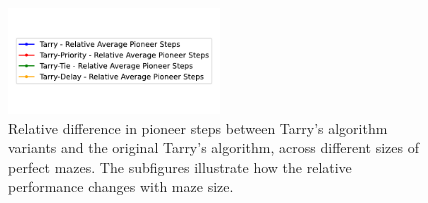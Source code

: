 \begin{figure}[H]
    \centering
    \qquad
    \qquad
    \includegraphics[width=0.5\textwidth]{Cap3/tarry_var_steps_legend_relative.pdf}
    \newline
    \qquad
    \newline
    \qquad
    \caption{Relative difference in pioneer steps between Tarry's algorithm variants and the original Tarry's algorithm, across different sizes of perfect mazes. The subfigures illustrate how the relative performance changes with maze size.}
    \label{fig_tarry_steps_relative_all_sizes_maze}
\end{figure}


